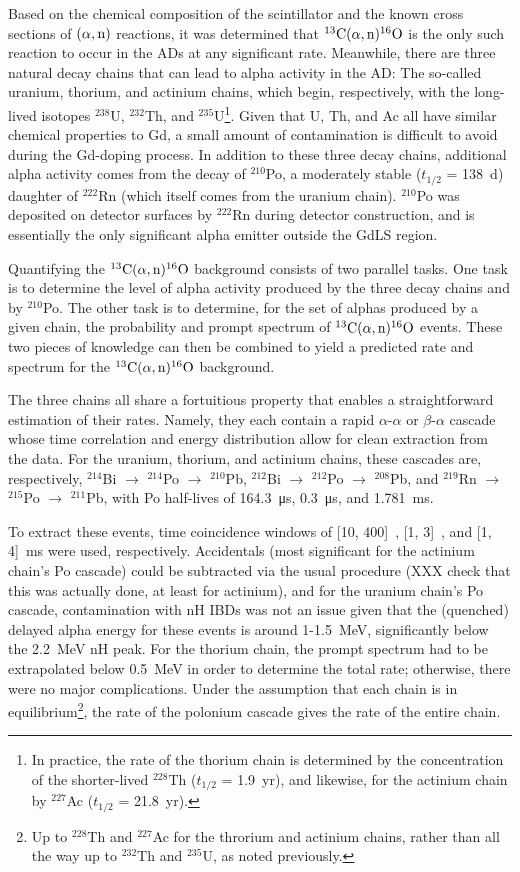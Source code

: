 \documentclass[../thesis.tex]{subfiles}
\begin{document}
Based on the chemical composition of the scintillator and the known cross
sections of $(\alpha,\mathrm{n})$ reactions, it was determined that $^{13}\mathrm{C}(\alpha, \mathrm{n})^{16}\mathrm{O}$ is the only such
reaction to occur in the ADs at any significant rate. Meanwhile, there are three
natural decay chains that can lead to alpha activity in the AD: The so-called
uranium, thorium, and actinium chains, which begin, respectively, with the
long-lived isotopes $^{238}$U, $^{232}$Th, and $^{235}$U\footnote{In practice,
  the rate of the thorium chain is determined by the concentration of the
  shorter-lived $^{228}$Th ($t_{1/2}$ = 1.9~yr), and likewise, for the actinium
  chain by $^{227}$Ac ($t_{1/2}$ = 21.8~yr).}. Given that U, Th, and Ac all have
similar chemical properties to Gd, a small amount of contamination is difficult
to avoid during the Gd-doping process. In addition to these three decay chains,
additional alpha activity comes from the decay of $^{210}$Po, a moderately
stable ($t_{1/2}$ = 138~d) daughter of $^{222}$Rn (which itself comes from the
uranium chain). $^{210}$Po was deposited on detector surfaces by $^{222}$Rn
during detector construction, and is essentially the only significant alpha
emitter outside the GdLS region.

Quantifying the $^{13}\mathrm{C}(\alpha, \mathrm{n})^{16}\mathrm{O}$ background consists of two parallel tasks. One task is
to determine the level of alpha activity produced by the three decay chains and
by $^{210}$Po. The other task is to determine, for the set of alphas produced by
a given chain, the probability and prompt spectrum of $^{13}\mathrm{C}(\alpha, \mathrm{n})^{16}\mathrm{O}$ events. These two
pieces of knowledge can then be combined to yield a predicted rate and spectrum
for the $^{13}\mathrm{C}(\alpha, \mathrm{n})^{16}\mathrm{O}$ background.

The three chains all share a fortuitious property that enables a straightforward
estimation of their rates. Namely, they each contain a rapid $\alpha$-$\alpha$
or $\beta$-$\alpha$ cascade whose time correlation and energy distribution allow
for clean extraction from the data. For the uranium, thorium, and actinium
chains, these cascades are, respectively, $^{214}$Bi $\to$ $^{214}$Po $\to$
$^{210}$Pb, $^{212}$Bi $\to$ $^{212}$Po $\to$ $^{208}$Pb, and $^{219}$Rn $\to$
$^{215}$Po $\to$ $^{211}$Pb, with Po half-lives of \SI{164.3}{\micro s},
\SI{0.3}{\micro s}, and \SI{1.781}{ms}.

To extract these events, time coincidence windows of [10, 400]~\us, [1, 3]~\us,
and [1, 4]~ms were used, respectively. Accidentals (most significant for the
actinium chain's Po cascade) could be subtracted via the usual procedure (XXX
check that this was actually done, at least for actinium), and for the uranium
chain's Po cascade, contamination with nH IBDs was not an issue given that the
(quenched) delayed alpha energy for these events is around 1-1.5~MeV,
significantly below the 2.2~MeV nH peak. For the thorium chain, the prompt
spectrum had to be extrapolated below 0.5~MeV in order to determine the total
rate; otherwise, there were no major complications. Under the assumption that
each chain is in equilibrium\footnote{Up to $^{228}$Th and $^{227}$Ac for the
  throrium and actinium chains, rather than all the way up to $^{232}$Th and
  $^{235}$U, as noted previously.}, the rate of the polonium cascade gives the
rate of the entire chain.
\end{document}
